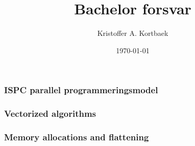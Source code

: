 \documentclass{beamer}
\title{Bachelor forsvar}
\author{Kristoffer A. Kortbaek}
\date{\today}
\begin{document}
\begin{frame}
  \titlepage
\end{frame}

\begin{frame}
  \frametitle{ISPC parallel programmeringsmodel}
\end{frame}

\begin{frame}
  \frametitle{Vectorized algorithms}
\end{frame}

\begin{frame}
  \frametitle{Memory allocations and flattening}
\end{frame}
\end{document}
